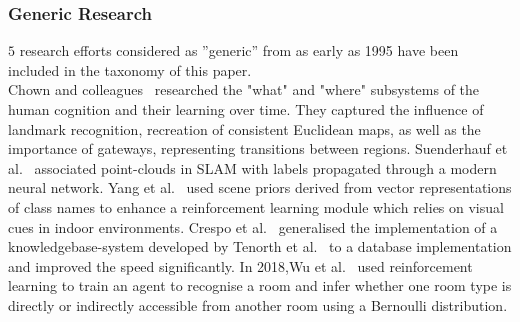 \documentclass[twocolumn,letterpaper]{IEEEAerospaceCLS}  %
\begin{document}
\subsubsection{Generic Research} \label{sssec:ResLitHist}
$5$ research efforts considered as ''generic'' from as early as 1995  have been included in the taxonomy of this paper.\\
Chown and colleagues~\cite{chown_prototypes_1995} researched the "what" and "where" subsystems of the human cognition and their learning over time. They captured the influence of landmark recognition, recreation of consistent Euclidean maps, as well as the importance of gateways, representing transitions between regions. Suenderhauf et al.~\cite{sunderhauf_meaningful_2017} associated point-clouds in SLAM with labels propagated through a modern neural network. Yang et al.~\cite{yang_visual_2018} used scene priors derived from vector representations of class names to enhance a reinforcement learning module which relies on visual cues in indoor environments. Crespo et al.~\cite{crespo_reasoning_2018} generalised the implementation of a knowledgebase-system developed by Tenorth et al.~\cite{tenorth_knowrob-map_2010} to a database implementation and improved the speed significantly. In 2018,Wu et al.~\cite{wu_learning_2018} used reinforcement learning to train an agent to recognise a room and infer whether one room type is directly or indirectly accessible from another room using a Bernoulli distribution.
\end{document}
